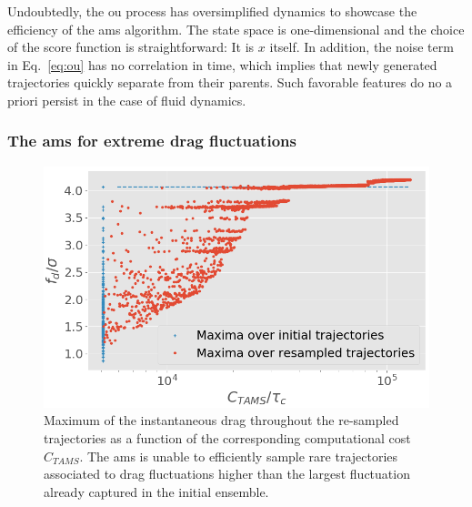 \documentclass[pre,aps,floatfix,10pt,superscriptaddress, notitlepage,preprint]{revtex4-1}
\begin{document}
Undoubtedly, the \acl{ou} process has oversimplified dynamics to showcase the efficiency of the \ac{ams} algorithm.
The state space is one-dimensional and the choice of the score function is straightforward: It is $x$ itself.
In addition, the noise term in Eq.~\eqref{eq:ou} has no correlation in time, which implies that newly generated trajectories quickly separate from their parents. Such favorable features do no a priori persist in the case of fluid dynamics.


\subsubsection{The \ac{ams} for extreme drag fluctuations}
\label{sec:ams_drag}

\begin{figure}
	\centering
	\includegraphics[width=.7\linewidth]{AMS_drag_resampling/AMS_drag_resampling.png}
	\caption{\label{fig:AMS_drag_resampling} Maximum of the instantaneous drag throughout the re-sampled trajectories as a function of the corresponding computational cost $C_{TAMS}$. The \ac{ams} is unable to efficiently sample rare trajectories associated to drag fluctuations higher than the largest fluctuation already captured in the initial ensemble.}
\end{figure}
\end{document}
